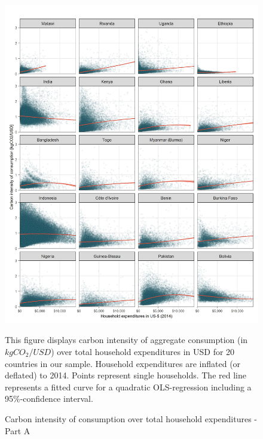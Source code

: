 \documentclass[12pt, a4paper]{article}
\newenvironment{subcaption}
{\strut
\vspace{-5pt}
\begin{minipage}[b]{0.9\textwidth}
  \hspace*{-\parindent}
  \footnotesize}
 {\end{minipage}}
\begin{document}
\begin{figure}[ht!]
  \centering
  \caption{Carbon intensity of consumption over total household expenditures - Part A} \label{fig:C1}
  \includegraphics{Analysis_Carbon_Intensity_Curve/All_Panel_A}
  \begin{subcaption}
    This figure displays carbon intensity of aggregate consumption (in $kgCO_{2}/USD$) over total household expenditures in USD for 20 countries in our sample. Household expenditures are inflated (or deflated) to 2014. Points represent single households. The red line represents a fitted curve for a quadratic OLS-regression including a 95\%-confidence interval.
  \end{subcaption}

\end{figure}

\clearpage
\end{document}
